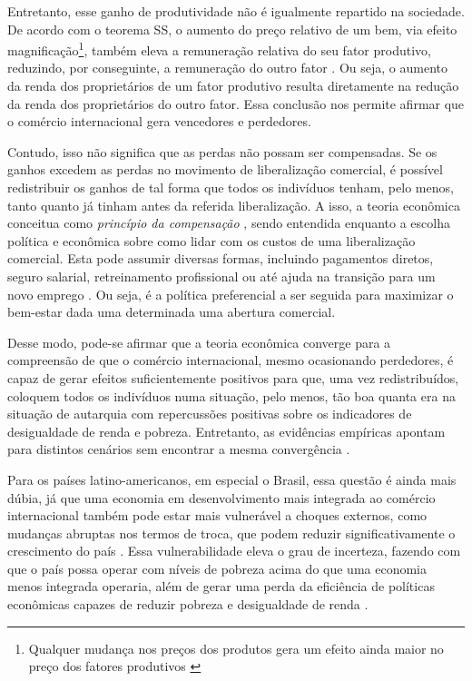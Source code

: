 Entretanto, esse ganho de produtividade não é igualmente repartido na sociedade. De acordo com o teorema SS, o aumento do preço relativo de um bem, via efeito magnificação\footnote{Qualquer mudança nos preços dos produtos gera um efeito ainda maior no preço dos fatores produtivos \cite{jones65}}, também eleva a remuneração relativa do seu fator produtivo, reduzindo, por conseguinte, a remuneração do outro fator \cite{stolper41}. Ou seja, o aumento da renda dos proprietários de um fator produtivo resulta diretamente na redução da renda dos proprietários do outro fator. Essa conclusão nos permite afirmar que o comércio internacional gera vencedores e perdedores.

Contudo, isso não significa que as perdas não possam ser compensadas. Se os ganhos excedem as perdas no movimento de liberalização comercial, é possível redistribuir os ganhos de tal forma que todos os indivíduos tenham, pelo menos, tanto quanto já tinham antes da referida liberalização. A isso, a teoria econômica conceitua como \textit{princípio da compensação} \cite{irwin98}, sendo entendida enquanto a escolha política e econômica sobre como lidar com os custos de uma liberalização comercial. Esta pode assumir diversas formas, incluindo pagamentos diretos, seguro salarial, retreinamento profissional ou até ajuda na transição para um novo emprego \cite{kolben21}. Ou seja, é a política preferencial a ser seguida para maximizar o bem-estar dada uma determinada uma abertura comercial.

Desse modo, pode-se afirmar que a teoria econômica converge para a compreensão de que o comércio internacional, mesmo ocasionando perdedores, é capaz de gerar efeitos suficientemente positivos para que, uma vez redistribuídos, coloquem todos os indivíduos numa situação, pelo menos, tão boa quanta era na situação de autarquia com repercussões positivas sobre os indicadores de desigualdade de renda e pobreza. Entretanto, as evidências empíricas apontam para distintos cenários sem encontrar a mesma convergência \cite{winters04}.

Para os países latino-americanos, em especial o Brasil, essa questão é ainda mais dúbia, já que uma economia em desenvolvimento mais integrada ao comércio internacional também pode estar mais vulnerável a choques externos, como mudanças abruptas nos termos de troca, que podem reduzir significativamente o crescimento do país \cite{bannisterthugge01}. Essa vulnerabilidade eleva o grau de incerteza, fazendo com que o país possa operar com níveis de pobreza acima do que uma economia menos integrada operaria, além de gerar uma perda da eficiência de políticas econômicas capazes de reduzir pobreza e desigualdade de renda \cite{winters02}.

